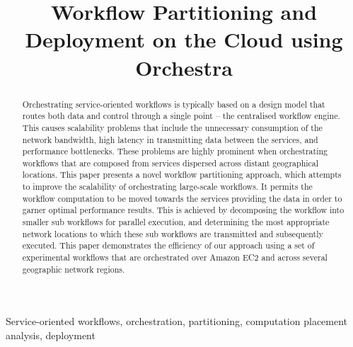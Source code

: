 \documentclass[10pt, conference, compsocconf]{IEEEtran}
\begin{document}
\title{Workflow Partitioning and Deployment on the Cloud using Orchestra}
\author{
}
\maketitle
\begin{abstract}
Orchestrating service-oriented workflows is typically based on a design model that routes both data and control through a single point -- the centralised workflow engine.
This causes scalability problems that include the unnecessary consumption of the network bandwidth, high latency in transmitting data between the services, and performance bottlenecks.
These problems are highly prominent when orchestrating workflows that are composed from services dispersed across distant geographical locations.
This paper presents a novel workflow partitioning approach, which attempts to improve the scalability of orchestrating large-scale workflows.
It permits the workflow computation to be moved towards the services providing the data in order to garner optimal performance results.
This is achieved by decomposing the workflow into smaller sub workflows for parallel execution, and determining the most appropriate network locations to which these sub workflows are transmitted and subsequently executed.
This paper demonstrates the efficiency of our approach using a set of experimental workflows that are orchestrated over Amazon EC2 and across several geographic network regions.
\end{abstract}

\begin{IEEEkeywords}
Service-oriented workflows, orchestration, partitioning, computation placement analysis, deployment
\end{IEEEkeywords}
\IEEEpeerreviewmaketitle
\end{document}
